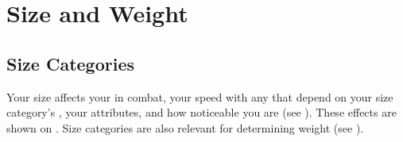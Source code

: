 \section{Size and Weight}\label{Size and Weight}

    \subsection{Size Categories}\label{Size Categories}
        Your size affects your  in combat, your speed with any  that depend on your size category's , your attributes, and how noticeable you are (see ).
        These effects are shown on .
        Size categories are also relevant for determining weight (see ).

